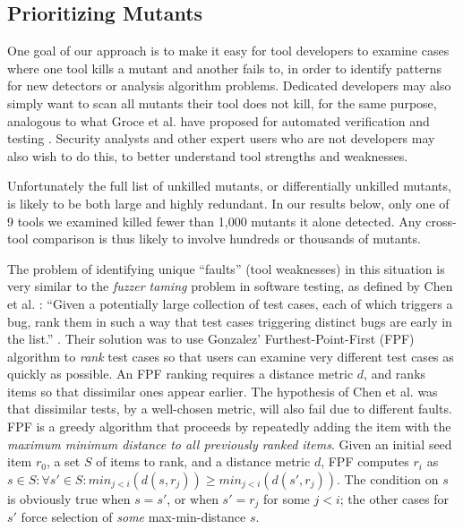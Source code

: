 \subsection{Prioritizing Mutants}
\label{sec:prioritizing}

One goal of our approach is to make it easy for tool developers to examine cases where one tool kills a mutant and another fails to, in order to identify patterns for new detectors or analysis algorithm problems.  Dedicated developers may also simply want to scan all mutants their tool does not kill, for the same purpose, analogous to what Groce et al. have proposed for automated verification and testing \cite{groce2015verified,groce2018verified}.  Security analysts and other expert users who are not developers may also wish to do this, to better understand tool strengths and weaknesses.

Unfortunately the full list of unkilled mutants, or differentially
unkilled mutants, is likely to be both large and highly redundant.  In
our results below, only one of 9 tools we examined killed fewer than
1,000 mutants it alone detected.  Any cross-tool comparison is thus
likely to involve hundreds or thousands of mutants.

The problem of identifying unique ``faults'' (tool weaknesses) in this
situation is very similar to the \emph{fuzzer taming} problem in
software testing, as defined by Chen et al. \cite{PLDI13}: ``Given a
potentially large collection of test cases, each of which triggers a
bug, rank them in such a way that test cases triggering distinct bugs
are early in the list.'' \cite{PLDI13}.  Their solution was
to use Gonzalez' Furthest-Point-First \cite{Gonzalez} (FPF) algorithm
to \emph{rank} test cases so that users can examine very different
test cases as quickly as possible.  An
FPF ranking requires a distance metric $d$, and ranks items so that
dissimilar ones appear earlier.
The hypothesis of Chen et al. was that dissimilar tests, by a
well-chosen metric, will also fail due to different faults.  FPF is a
greedy algorithm that proceeds by repeatedly adding the item with the
\emph{maximum minimum distance to all previously ranked items}. Given an
initial seed item $r_0$, a set $S$ of items to rank, and a distance
metric $d$, FPF computes $r_i$ as
$s \in S: \forall s' \in S: min_{ j < i}(d(s,r_j)) \geq min_{j <
  i}(d(s',r_j))$.  The condition on $s$ is obviously true when
$s = s'$, or when $s' = r_j$ for some $j < i$; the other cases for
$s'$ force selection of \emph{some}
max-min-distance $s$.

